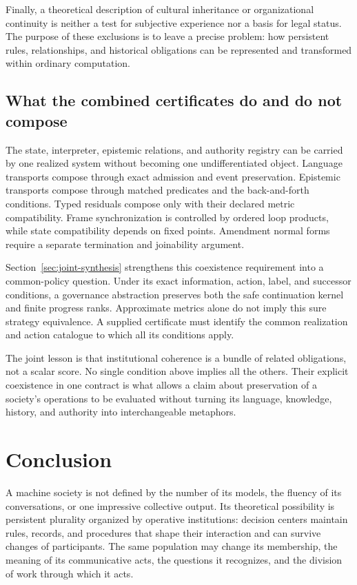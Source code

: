 \documentclass[11pt,letterpaper]{article}
\theoremstyle{plain}
\theoremstyle{definition}
\theoremstyle{remark}
\begin{document}
Finally, a theoretical description of cultural inheritance or organizational continuity is neither a test for subjective experience nor a basis for legal status. The purpose of these exclusions is to leave a precise problem: how persistent rules, relationships, and historical obligations can be represented and transformed within ordinary computation.

\subsection{What the combined certificates do and do not compose}
The state, interpreter, epistemic relations, and authority registry can be carried by one realized system without becoming one undifferentiated object. Language transports compose through exact admission and event preservation. Epistemic transports compose through matched predicates and the back-and-forth conditions. Typed residuals compose only with their declared metric compatibility. Frame synchronization is controlled by ordered loop products, while state compatibility depends on fixed points. Amendment normal forms require a separate termination and joinability argument.

Section~\ref{sec:joint-synthesis} strengthens this coexistence requirement into a common-policy question. Under its exact information, action, label, and successor conditions, a governance abstraction preserves both the safe continuation kernel and finite progress ranks. Approximate metrics alone do not imply this sure strategy equivalence. A supplied certificate must identify the common realization and action catalogue to which all its conditions apply.

The joint lesson is that institutional coherence is a bundle of related obligations, not a scalar score. No single condition above implies all the others. Their explicit coexistence in one contract is what allows a claim about preservation of a society's operations to be evaluated without turning its language, knowledge, history, and authority into interchangeable metaphors.

\section{Conclusion}\label{sec:conclusion}
A machine society is not defined by the number of its models, the fluency of its conversations, or one impressive collective output. Its theoretical possibility is persistent plurality organized by operative institutions: decision centers maintain rules, records, and procedures that shape their interaction and can survive changes of participants. The same population may change its membership, the meaning of its communicative acts, the questions it recognizes, and the division of work through which it acts.
\end{document}
